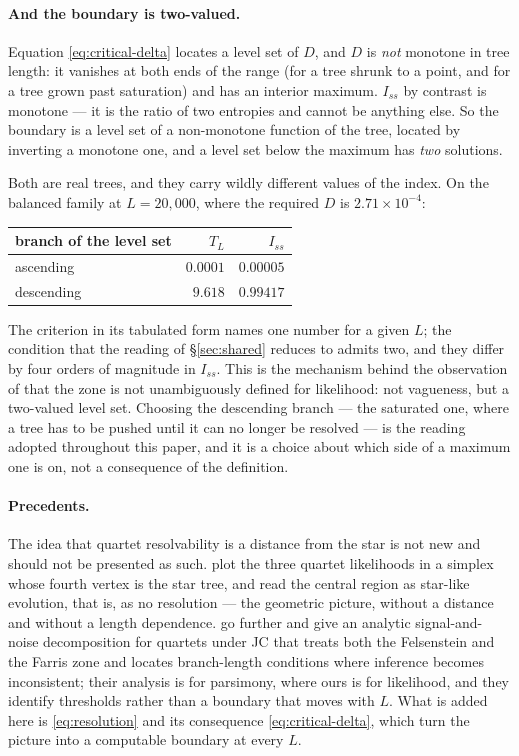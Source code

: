 \documentclass[preprint,12pt,authoryear]{elsarticle}
\newcommand{\Iss}{I_{ss}}
\newcommand{\TL}{T_L}
\theoremstyle{definition}
\theoremstyle{remark}
\begin{document}
\paragraph{And the boundary is two-valued.} Equation
\eqref{eq:critical-delta} locates a level set of $D$, and $D$ is
\emph{not} monotone in tree length: it vanishes at both ends of the range
(for a tree shrunk to a point, and for a tree grown past saturation) and has
an interior maximum. $\Iss$ by contrast is monotone --- it is the ratio of
two entropies and cannot be anything else. So the boundary is a level set of
a non-monotone function of the tree, located by inverting a monotone one, and
a level set below the maximum has \emph{two} solutions.

Both are real trees, and they carry wildly different values of the index. On
the balanced family at $L=20{,}000$, where the required $D$ is
$2.71\times10^{-4}$:

\begin{center}
\begin{tabular}{lrr}
\toprule
branch of the level set & $\TL$ & $\Iss$ \\
\midrule
ascending  & $0.0001$ & $0.00005$ \\
descending & $9.618$  & $0.99417$ \\
\bottomrule
\end{tabular}
\end{center}

The criterion in its tabulated form names one number for a given $L$; the
condition that the reading of \S\ref{sec:shared} reduces to admits two, and
they differ by four orders of magnitude in $\Iss$. This is the mechanism
behind the observation of \citet{leuchtenberger2020} that the zone is not
unambiguously defined for likelihood: not vagueness, but a two-valued level
set. Choosing the descending branch --- the saturated one, where a tree has
to be pushed until it can no longer be resolved --- is the reading adopted
throughout this paper, and it is a choice about which side of a maximum one
is on, not a consequence of the definition.

\paragraph{Precedents.} The idea that quartet resolvability is a distance
from the star is not new and should not be presented as such.
\citet{strimmer1997} plot the three quartet likelihoods in a simplex whose
fourth vertex is the star tree, and read the central region as star-like
evolution, that is, as no resolution --- the geometric picture, without a
distance and without a length dependence. \citet{su2015} go further and give
an analytic signal-and-noise decomposition for quartets under JC that treats
both the Felsenstein and the Farris zone and locates branch-length conditions
where inference becomes inconsistent; their analysis is for parsimony, where
ours is for likelihood, and they identify thresholds rather than a boundary
that moves with $L$. What is added here is \eqref{eq:resolution} and its
consequence \eqref{eq:critical-delta}, which turn the picture into a
computable boundary at every $L$.
\end{document}
